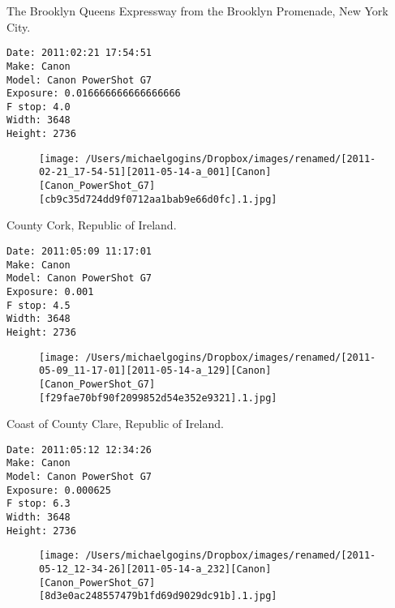 \documentclass[11pt,letter,DIV=14,paper=landscape]{scrbook}
\begin{document}
\clearpage
\noindent The Brooklyn Queens Expressway from the Brooklyn Promenade, New York City.
\noindent
\begin{lstlisting}
Date: 2011:02:21 17:54:51
Make: Canon
Model: Canon PowerShot G7
Exposure: 0.016666666666666666
F stop: 4.0
Width: 3648
Height: 2736
\end{lstlisting}
\clearpage

\begin{figure}
\texttt{[image: /Users/michaelgogins/Dropbox/images/renamed/[2011-02-21\_17-54-51][2011-05-14-a\_001][Canon][Canon\_PowerShot\_G7][cb9c35d724dd9f0712aa1bab9e66d0fc].1.jpg]}
\end{figure}
    
\clearpage
\noindent County Cork, Republic of Ireland.
\noindent
\begin{lstlisting}
Date: 2011:05:09 11:17:01
Make: Canon
Model: Canon PowerShot G7
Exposure: 0.001
F stop: 4.5
Width: 3648
Height: 2736
\end{lstlisting}
\clearpage

\begin{figure}
\texttt{[image: /Users/michaelgogins/Dropbox/images/renamed/[2011-05-09\_11-17-01][2011-05-14-a\_129][Canon][Canon\_PowerShot\_G7][f29fae70bf90f2099852d54e352e9321].1.jpg]}
\end{figure}
    
\clearpage
\noindent Coast of County Clare, Republic of Ireland.
\noindent
\begin{lstlisting}
Date: 2011:05:12 12:34:26
Make: Canon
Model: Canon PowerShot G7
Exposure: 0.000625
F stop: 6.3
Width: 3648
Height: 2736
\end{lstlisting}
\clearpage

\begin{figure}
\texttt{[image: /Users/michaelgogins/Dropbox/images/renamed/[2011-05-12\_12-34-26][2011-05-14-a\_232][Canon][Canon\_PowerShot\_G7][8d3e0ac248557479b1fd69d9029dc91b].1.jpg]}
\end{figure}
    
\end{document}
